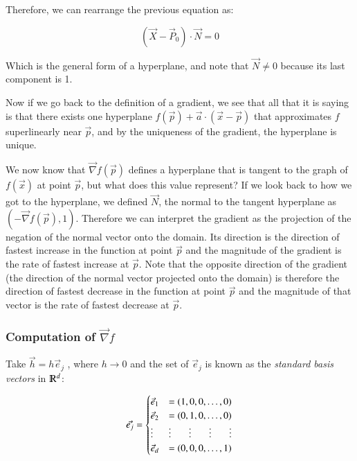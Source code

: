 \documentclass [12 pt, twoside] {book}
\newcommand\+{\text{ }}
\begin{document}
Therefore, we can rearrange the previous equation as:

$$(\vec{X} - \vec{P}_0) \cdot \vec{N} = 0$$

Which is the general form of a hyperplane, and note that $\vec{N} \neq 0$
because its last component is 1.

Now if we go back to the definition of a gradient, we see that all that it is
saying is that there exists one hyperplane $f(\vec{p}) + \vec{a}\cdot(\vec{x} -
\vec{p})$ that approximates $f$ superlinearly near $\vec{p}$, and by the
uniqueness of the gradient, the hyperplane is unique.

We now know that $\vec{\nabla} f(\vec{p})$ defines a hyperplane that is tangent to the
graph of $f(\vec{x})$ at point $\vec{p}$, but what does this value represent? If
we look back to how we got to the hyperplane, we defined $\vec{N}$, the normal
to the tangent hyperplane as $(-\vec{\nabla}f(\vec{p}), 1)$. Therefore we can
interpret the gradient as the projection of the negation of the normal vector
onto the domain. Its direction is the direction of fastest increase in the
function at point $\vec{p}$ and the magnitude of the gradient is the rate of
fastest increase at $\vec{p}$. Note that the opposite direction of the gradient
(the direction of the normal vector projected onto the domain) is therefore the
direction of fastest decrease in the function at point $\vec{p}$ and the
magnitude of that vector is the rate of fastest decrease at $\vec{p}$.

\subsubsection{Computation of $\vec{\nabla}f$}

Take $\vec{h} = h\vec{e}_j$ , where $h\to 0$ and the set of $\vec{e}_j$ is known
as the \textit{standard basis vectors} in $\varmathbb{R}^d$:

\begin{equation*}
    \vec{e_j}=
    \begin{cases}
        \vec{e}_1 &= (1,0,0,\dots,0)\\
        \vec{e}_2 &= (0,1,0,\dots,0)\\
        \vdots & \vdots \hfill \vdots \hfill \vdots \hfill \vdots\\
        \vec{e}_d &= (0,0,0,\dots,1)\\
    \end{cases}
\end{equation*}
\end{document}
